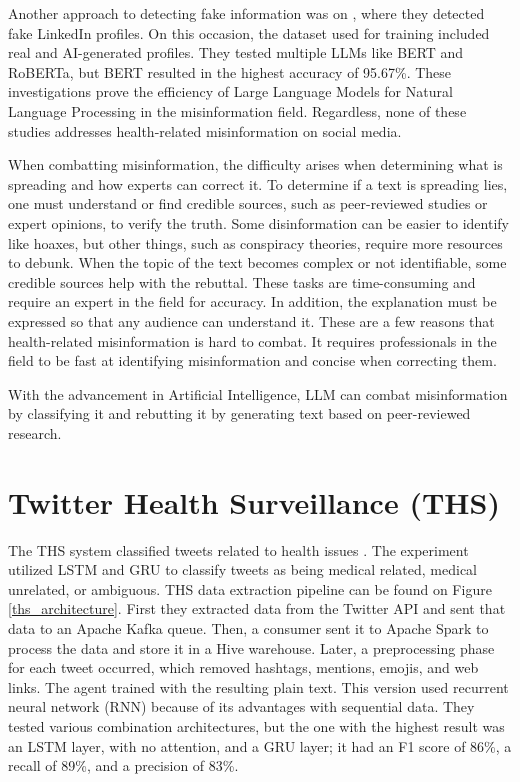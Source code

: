 Another approach to detecting fake information was on \cite{Ayoobi_2023}, where they detected fake LinkedIn profiles. On this occasion, the dataset used for training included real and AI-generated profiles. They tested multiple
LLMs like BERT and RoBERTa, but BERT resulted in the highest accuracy of 95.67\%. These investigations prove the efficiency of Large Language Models for Natural Language Processing in the misinformation field. Regardless,
none of these studies addresses health-related misinformation on social media. 

When combatting misinformation, the difficulty arises when determining what is spreading and how experts can correct it. To determine if a text is spreading lies, one must understand or find credible sources,
such as peer-reviewed studies or expert opinions, to verify the truth. Some disinformation can be easier to identify like hoaxes, but other things, such as conspiracy theories, require more resources to debunk.
When the topic of the text becomes complex or not identifiable, some credible sources help with the rebuttal. These tasks are time-consuming and require an expert in the field for accuracy. In addition, the
explanation must be expressed so that any audience can understand it. These are a few reasons that health-related misinformation is hard to combat. It requires professionals in the field to be fast at identifying
misinformation and concise when correcting them. 

With the advancement in Artificial Intelligence, LLM can combat misinformation by classifying it and rebutting it by generating text based on peer-reviewed research. 


\section{Twitter Health Surveillance (THS)}
The THS system classified tweets related to health issues \cite{8622504}. The experiment utilized LSTM and GRU to classify tweets as being medical related, medical unrelated, or ambiguous. THS
data extraction pipeline can be found on Figure \ref{ths_architecture}. First they extracted data from the Twitter API and sent that data to an Apache Kafka queue. Then, a consumer sent it to Apache Spark
to process the data and store it in a Hive warehouse. Later, a preprocessing phase for each tweet occurred, which removed hashtags, mentions, emojis, and web links. The agent trained with the resulting
plain text. This version used recurrent neural network (RNN) because of its advantages with sequential data. They tested various combination architectures, but the one with the highest result was an
LSTM layer, with no attention, and a GRU layer; it had an F1 score of 86\%, a recall of 89\%, and a precision of 83\%.  
 
